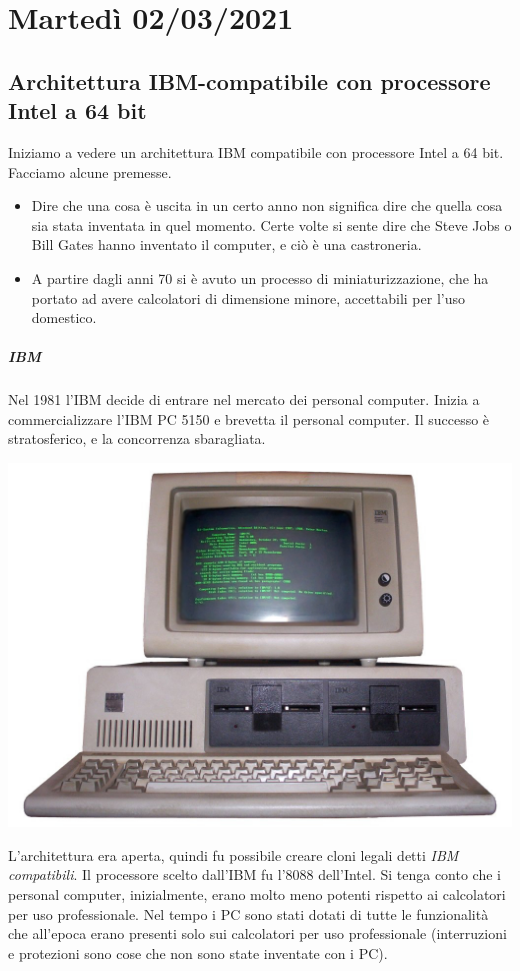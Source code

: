 \chapter{Martedì 02/03/2021}
\section{Architettura IBM-compatibile con processore Intel a 64 bit}
Iniziamo a vedere un architettura IBM compatibile con processore Intel a 64 bit. Facciamo alcune premesse.
\begin{itemize}
	\item Dire che una cosa è uscita in un certo anno non significa dire che quella cosa sia stata inventata in quel momento. Certe volte si sente dire che Steve Jobs o Bill Gates hanno inventato il computer, e ciò è una castroneria.
	\item A partire dagli anni 70 si è avuto un processo di miniaturizzazione, che ha portato ad avere calcolatori di dimensione minore, accettabili per l'uso domestico.
\end{itemize}
\paragraph{IBM} Nel 1981 l'IBM decide di entrare nel mercato dei personal computer. Inizia a commercializzare l'IBM PC 5150 e brevetta il personal computer. Il successo è stratosferico, e la concorrenza sbaragliata. 
\begin{center}
	\includegraphics[scale=.25]{img/130.PNG}
\end{center}L'architettura era aperta, quindi fu possibile creare cloni legali detti \emph{IBM compatibili}. Il processore scelto dall'IBM fu l'8088 dell'Intel. 
Si tenga conto che i personal computer, inizialmente, erano molto meno potenti rispetto ai calcolatori per uso professionale. Nel tempo i PC sono stati dotati di tutte le funzionalità che all'epoca erano presenti solo sui calcolatori per uso professionale (interruzioni e protezioni sono cose che non sono state inventate con i PC).
